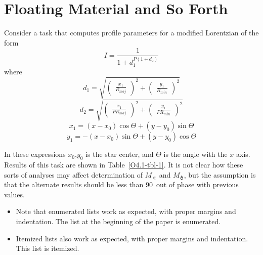 \documentclass[11pt,twoside]{article}  %
\begin{document}
%
%

\section{Floating Material and So Forth}

Consider a task that computes profile parameters for a modified
Lorentzian of the form
\begin{equation}
I = \frac{1}{1 + d_{1}^{P (1 + d_{2} )}}
\end{equation}
where
\begin{displaymath}
d_{1} = \sqrt{ \left( \begin{array}{c} \frac{x_{1}}{R_{maj}} 
\end{array} \right) ^{2} + 
\left( \begin{array}{c} \frac{y_{1}}{R_{min}} \end{array} \right) ^{2} }
\end{displaymath}
\begin{displaymath}
d_{2} = \sqrt{ \left( \begin{array}{c} \frac{x_{1}}{P R_{maj}}
\end{array} \right) ^{2} + 
\left( \begin{array}{c} \frac{y_{1}}{P R_{min}} \end{array} \right) ^{2} }
\end{displaymath}
\[x_{1} = (x - x_{0}) \cos \Theta + (y - y_{0}) \sin \Theta \]
\[y_{1} = -(x - x_{0}) \sin \Theta + (y - y_{0}) \cos \Theta \]

In these expressions $x_{0}$,$y_{0}$ is the star center, and $\Theta$
is the angle with the $x$ axis.  Results of this task are shown in
Table~\ref{O4.1-tbl-1}.  It is not clear how these sorts of analyses may
affect determination of $M_{\sun}$ and $M_{\earth}$, but the
assumption is that the alternate results should be less than 90\deg\
out of phase with previous values.

\begin{itemize}
\item Note that enumerated lists work as expected, with
proper margins and indentation. The list at the
beginning of the paper is enumerated.
\item Itemized lists also work as expected, with proper
margins and indentation.  This list is itemized.
\end{itemize}
\end{document}
